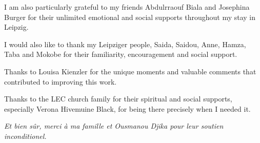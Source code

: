 I am also particularly grateful to my friends Abdulrraouf Biala and Josephina Burger for their unlimited emotional and social supports throughout my stay in Leipzig. 

I would also like to thank my Leipziger people, Saida, Saidou, Anne, Hamza,  Taba and Mokobe for their familiarity, encouragement and social support. 

Thanks to Louisa Kienzler for the unique moments and valuable comments that contributed to improving this work. 

Thanks to the LEC church family for their spiritual and social supports, especially Verona Hivemuine Black, for being there precisely when I needed it.

\textit{Et bien sûr, merci à ma famille et Ousmanou Djika pour leur soutien inconditionel. }


\bigskip



\endgroup
